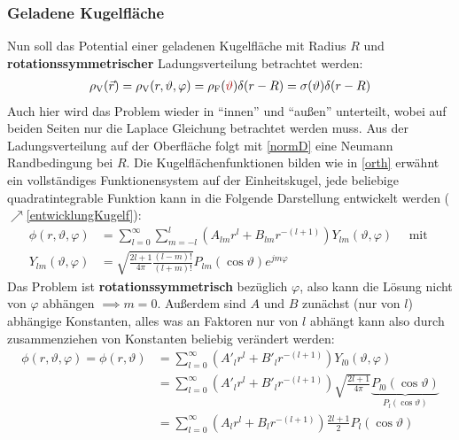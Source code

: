   \subsubsection{Geladene Kugelfläche}
		   Nun soll das Potential einer geladenen Kugelfläche mit Radius $R$ und \textbf{rotationssymmetrischer} Ladungsverteilung betrachtet werden:
		        \begin{equation}\begin{split}
				        \rho_\text{V} (\vec{r} ) =\rho_\text{V} (r,\vartheta,\varphi) = \rho_\text{F} (\textcolor{red}{\vartheta}) \delta(r-R) = \sigma(\vartheta) \delta(r-R)
			        \end{split}\end{equation}
		   Auch hier wird das Problem wieder in \enquote{innen} und \enquote{außen} unterteilt, wobei auf beiden Seiten nur die Laplace Gleichung betrachtet werden muss. Aus der Ladungsverteilung auf der Oberfläche folgt mit \ref{normD} eine Neumann Randbedingung bei $R$. Die Kugelflächenfunktionen bilden wie in \ref{orth} erwähnt ein vollständiges Funktionensystem auf der Einheitskugel, jede beliebige quadratintegrable Funktion kann in die Folgende Darstellung entwickelt werden ($\nearrow$\ref{entwicklungKugelf}):		        \begin{equation}\begin{split}
				        \phi(r, \vartheta,\varphi) &= \sum_{l=0}^{\infty}\sum_{m=-l}^l  (A_{lm} r^l+ B_{lm} r^{-(l+1)}) Y_{lm}(\vartheta,\varphi)\quad \text{ mit } \\Y_{lm}(\vartheta,\varphi)&= \sqrt{\frac{2l+1}{4\pi}\frac{(l-m)!}{(l+m)!}} P_{lm}(\cos\vartheta) e^{jm\varphi}
			        \end{split}\end{equation}
		  Das Problem ist \textbf{rotationssymmetrisch} bezüglich $\varphi$, also kann die Lösung nicht von $\varphi$ abhängen $\implies m=0$. Außerdem sind $A$ und $B$ zunächst (nur von $l$) abhängige Konstanten, alles was an Faktoren nur von $l$ abhängt kann also durch zusammenziehen von Konstanten beliebig verändert werden:
		        \begin{equation}\begin{split}
				        \phi(r, \vartheta,\varphi) = \phi(r, \vartheta) &= \sum_{l=0}^{\infty} (A'_{l} r^l+ B'_{l} r^{-(l+1)}) Y_{l0}(\vartheta,\varphi)\\
				        &= \sum_{l=0}^{\infty} (A'_{l} r^l+ B'_{l} r^{-(l+1)}) \sqrt{\frac{2l+1}{4\pi}} \underbrace{P_{l0}(\cos\vartheta)}_{P_l (\cos\vartheta)}\\
				        & = \sum_{l=0}^{\infty} (A_{l} r^l+ B_{l} r^{-(l+1)}) \frac{2l+1}{2} P_l (\cos\vartheta)
			        \end{split}\end{equation}
